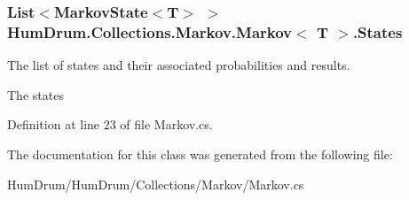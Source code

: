 \subsubsection[{\texorpdfstring{States}{States}}]{\setlength{\rightskip}{0pt plus 5cm}List$<${\bf Markov\+State}$<$T$>$ $>$ {\bf Hum\+Drum.\+Collections.\+Markov.\+Markov}$<$ T $>$.States\hspace{0.3cm}{\ttfamily [get]}}\hypertarget{classHumDrum_1_1Collections_1_1Markov_1_1Markov_a71899515d7da8d3078ec114a7b622a5f}{}\label{classHumDrum_1_1Collections_1_1Markov_1_1Markov_a71899515d7da8d3078ec114a7b622a5f}


The list of states and their associated probabilities and results. 

The states

Definition at line 23 of file Markov.\+cs.



The documentation for this class was generated from the following file\+:\begin{DoxyCompactItemize}
\item 
Hum\+Drum/\+Hum\+Drum/\+Collections/\+Markov/Markov.\+cs\end{DoxyCompactItemize}
